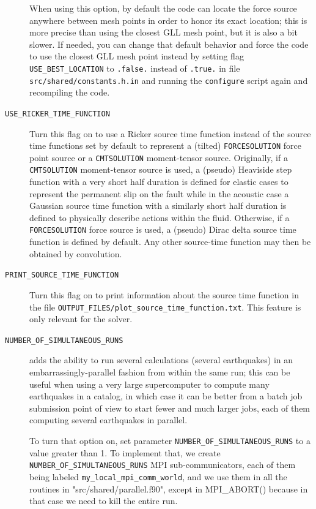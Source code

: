 \begin{description}
When using this option, by default the code can locate the force source
anywhere between mesh points in order to honor its exact location; this
is more precise than using the closest GLL mesh point, but it is also a bit slower.
If needed, you can change that default behavior and force the code to use the closest
GLL mesh point instead by setting flag \texttt{USE\_BEST\_LOCATION} to \texttt{.false.} instead of \texttt{.true.} in file
\texttt{src/shared/constants.h.in} and running the \texttt{configure} script again and recompiling the code.
\item [{\texttt{USE\_RICKER\_TIME\_FUNCTION}}] Turn this flag on to use
a Ricker source time function instead of the source time functions
set by default to represent a (tilted) \texttt{FORCESOLUTION} force
point source or a \texttt{CMTSOLUTION} moment-tensor source. Originally,
if a \texttt{CMTSOLUTION} moment-tensor source is used, a (pseudo)
Heaviside step function with a very short half duration is defined
for elastic cases to represent the permanent slip on the fault while
in the acoustic case a Gaussian source time function with a similarly
short half duration is defined to physically describe actions within
the fluid. Otherwise, if a \texttt{FORCESOLUTION} force source is
used, a (pseudo) Dirac delta source time function is defined by default.
Any other source-time function may then be obtained by convolution.
\item [{\texttt{PRINT\_SOURCE\_TIME\_FUNCTION}}] Turn this flag on to print
information about the source time function in the file \texttt{OUTPUT\_FILES/plot\_source\_time\_function.txt}.
This feature is only relevant for the solver.
%
\item [{\texttt{NUMBER\_OF\_SIMULTANEOUS\_RUNS}}] adds the ability to run several calculations (several earthquakes)
in an embarrassingly-parallel fashion from within the same run;
this can be useful when using a very large supercomputer to compute
many earthquakes in a catalog, in which case it can be better from
a batch job submission point of view to start fewer and much larger jobs,
each of them computing several earthquakes in parallel.

To turn that option on, set parameter \texttt{NUMBER\_OF\_SIMULTANEOUS\_RUNS} to a value greater than 1.
To implement that, we create \texttt{NUMBER\_OF\_SIMULTANEOUS\_RUNS} MPI sub-communicators,
each of them being labeled \texttt{my\_local\_mpi\_comm\_world}, and we use them
in all the routines in "src/shared/parallel.f90", except in MPI\_ABORT() because in that case
we need to kill the entire run.


\end{description}
